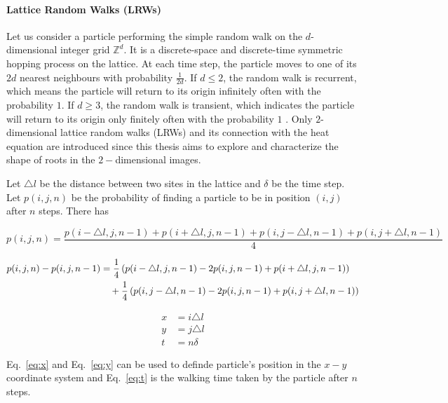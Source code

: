 \paragraph{Lattice Random Walks (LRWs)}

\newcommand{\p}{p(x,y,t)}


Let us consider a particle performing the simple random walk on the
$d$-dimensional integer grid $\mathbb{Z}^d$. It is a discrete-space
and discrete-time symmetric hopping process \cite{redner2001guide} on
the lattice. At each time step, the particle moves to one of its $2d$
nearest neighbours with probability $\frac{1}{2d}$. If $d \leq 2$, the
random walk is recurrent, which means the
particle will return to its origin infinitely often with the
probability $1$. If $d \geq 3$, the random walk is
transient, which indicates the particle will
return to its origin only finitely often with the probability
$1$ \cite{hughes1998random} \cite{lawler2010random}. Only $2$-dimensional lattice random walks
(LRWs) and its connection with the heat equation are introduced since
this thesis aims to explore and characterize the shape of roots in the
$2-$dimensional images.

Let $\triangle l$ be the distance between two sites in the lattice and
$\delta$ be the time step. Let $p(i, j, n)$ be the probability of
finding a particle to be in position $(i, j)$ after $n$ steps. There has

\begin{equation}\label{eq:p_ijn}
p(i, j, n) = \frac{p(i-\triangle l, j, n-1) + p(i + \triangle l, j, n-1) + p(i, j - \triangle l, n-1) + p(i, j + \triangle l, n-1)}{4}
\end{equation}

\begin{align}\label{eq:p_diff}
p(i, j, n) - p(i, j, n-1) & = \frac{1}{4}\left(p(i-\triangle l, j, n-1) - 2p(i,j, n-1) + p(i + \triangle l, j, n-1)\right) \notag \\
&\quad + \frac{1}{4}\left(p(i, j - \triangle l, n-1) - 2p(i,j, n-1) + p(i, j + \triangle l, n-1)\right)
\end{align}


\begin{align}
x &= i \triangle l \label{eq:x}\\
y &= j \triangle l \label{eq:y}\\
t &= n \delta \label{eq:t}
\end{align}

Eq.~\ref{eq:x} and Eq.~\ref{eq:y} can be used to definde particle's position in the $x-y$ coordinate system and Eq.~\ref{eq:t} is the walking time taken by the particle after $n$ steps.

